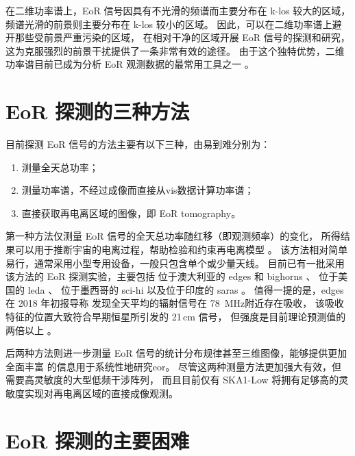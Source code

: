 在二维功率谱上，EoR 信号因具有不光滑的频谱而主要分布在 \ac{k-los} 较大的区域，
频谱光滑的前景则主要分布在 \ac{k-los} 较小的区域。
因此，可以在二维功率谱上避开那些受前景严重污染的区域，
在相对干净的区域开展 EoR 信号的探测和研究，
这为克服强烈的前景干扰提供了一条非常有效的途径。
由于这个独特优势，二维功率谱目前已成为分析 EoR 观测数据的最常用工具之一
\cite{trott2012,thyagarajan2013,barry2016,beardsley2016,trott2016,patil2017}。


\section{EoR 探测的三种方法}
\label{sec:det-methods}

目前探测 EoR 信号的方法主要有以下三种，由易到难分别为：
\begin{enumerate}
  \item 测量全天总功率；
  \item 测量功率谱，不经过成像而直接从\ac{vis}数据计算功率谱；
  \item 直接获取再电离区域的图像，即 EoR \ac{tomography}。
\end{enumerate}

第一种方法仅测量 EoR 信号的全天总功率随红移（即观测频率）的变化，
所得结果可以用于推断宇宙的电离过程，帮助检验和约束再电离模型
\cite{pritchard2012,liu2016}。
该方法相对简单易行，通常采用小型专用设备，一般只包含单个或少量天线。
目前已有一批采用该方法的 EoR 探测实验，主要包括
位于澳大利亚的 \ac{edges} \cite{bowman2008} 和
\ac{bighorns} \cite{sokolowski2015}、
位于美国的 \ac{leda} \cite{greenhill2012}、
位于墨西哥的 \ac{sci-hi} \cite{voytek2014}
以及位于印度的 \ac{saras} \cite{singh2018}。
值得一提的是，\acs{edges} 在 2018 年初报导称
发现全天平均的辐射信号在 \SI{78}{\MHz}附近存在吸收，
该吸收特征的位置大致符合早期恒星所引发的 21\,cm 信号，
但强度是目前理论预测值的两倍以上 \cite{bowman2018}。

后两种方法则进一步测量 EoR 信号的统计分布规律甚至三维图像，能够提供更加全面丰富
的信息用于系统性地研究\acl{eor}。
尽管这两种测量方法更加强大有效，但需要高灵敏度的大型低频干涉阵列，
而且目前仅有 SKA1-Low 将拥有足够高的灵敏度实现对再电离区域的直接成像观测。


\section{EoR 探测的主要困难}
\label{sec:det-difficulties}

